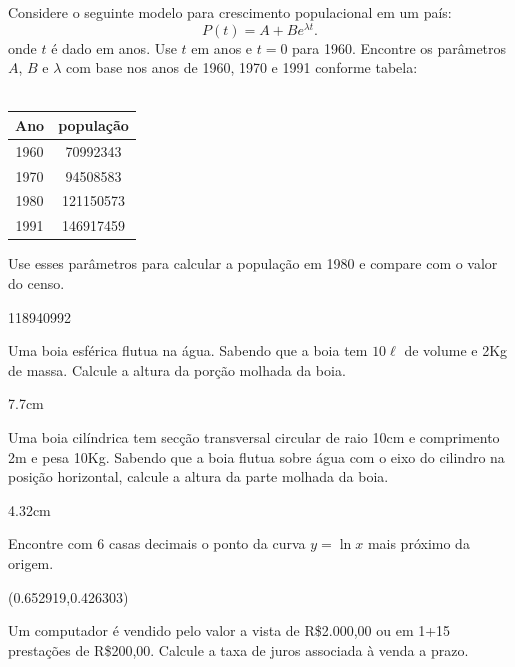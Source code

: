 \documentclass[main.tex]{subfiles}
\begin{document}
\begin{Exercise}\label{pop} Considere o seguinte modelo para crescimento populacional em um país:
$$P(t)=A+Be^{\lambda t}.$$
onde $t$ é dado em anos. Use $t$ em anos e $t=0$ para 1960. Encontre os parâmetros $A$, $B$ e $\lambda$ com base nos anos de 1960, 1970 e 1991 conforme tabela:\\~

\begin{tabular}{|c|c|}
\hline
Ano & população\\
\hline
1960&70992343\\
1970&94508583\\
1980&121150573\\
1991&146917459\\
\hline	
\end{tabular}

Use esses parâmetros para calcular a população em 1980 e compare com o valor do censo.
\end{Exercise}
\begin{Answer}
 118940992
\end{Answer}

\begin{Exercise}[title=Fluidos]\label{boiaesf} Uma boia esférica flutua na água. Sabendo que a boia tem $10\ell$ de volume e 2Kg de massa. Calcule a altura da porção molhada da boia.
\end{Exercise}
\begin{Answer}
 7.7cm
\end{Answer}

\begin{Exercise}[title= Fluidos]\label{boiacil} Uma boia cilíndrica tem secção transversal circular de raio 10cm e comprimento 2m e pesa 10Kg. Sabendo que a boia flutua sobre água com o eixo do cilindro na posição horizontal, calcule a altura da parte molhada da boia.
\end{Exercise}
\begin{Answer}
 4.32cm
\end{Answer}

\begin{Exercise} Encontre com 6 casas decimais o ponto da curva $y=\ln x$ mais próximo da origem.
\end{Exercise}
\begin{Answer}
(0.652919,0.426303)
\end{Answer}


\begin{Exercise}[title= Matemática financeira] Um computador é vendido pelo valor a vista de R\$2.000,00 ou em 1+15 prestações de R\$200,00. Calcule a taxa de juros associada à venda a prazo.
\end{Exercise}
\end{document}
